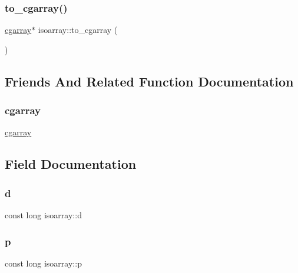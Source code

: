 \mbox{\label{classisoarray_a66ca849c4b34cafeee945037d814a8dc}} 
\subsubsection{\texorpdfstring{to\_cgarray()}{to\_cgarray()}\hspace{0.1cm}{\footnotesize\ttfamily [3/3]}}
{\footnotesize\ttfamily \mbox{\hyperlink{classcgarray}{cgarray}}$\ast$ isoarray\+::to\+\_\+cgarray (\begin{DoxyParamCaption}{ }\end{DoxyParamCaption})}



\subsection{Friends And Related Function Documentation}
\mbox{\label{classisoarray_a27c452d0372903eeb416af9256dacd0f}} 
\subsubsection{\texorpdfstring{cgarray}{cgarray}}
{\footnotesize\ttfamily \mbox{\hyperlink{classcgarray}{cgarray}}\hspace{0.3cm}{\ttfamily [friend]}}



\subsection{Field Documentation}
\mbox{\label{classisoarray_af3715f50052bd54b3476e9831fe4d71b}} 
\subsubsection{\texorpdfstring{d}{d}}
{\footnotesize\ttfamily const long isoarray\+::d}

\mbox{\label{classisoarray_adeea7560653c9c61f9ec7ca78ec1a43d}} 
\subsubsection{\texorpdfstring{p}{p}}
{\footnotesize\ttfamily const long isoarray\+::p}


